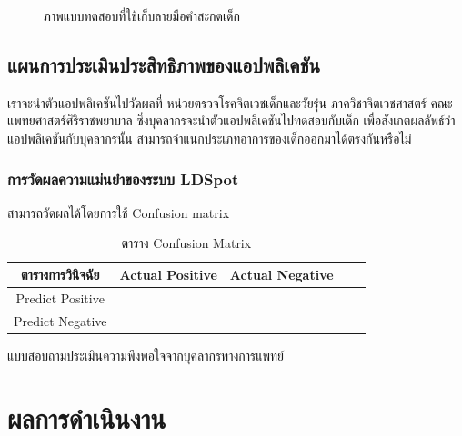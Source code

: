 \documentclass[12pt,oneside,openright,a4paper]{cpe-thai-project}
\begin{document}
\begin{figure}[!ht]\centering
  \setlength{\fboxrule}{0.2mm} %
  \setlength{\fboxsep}{1cm}
  \caption{ภาพแบบทดสอบที่ใช้เก็บลายมือคำสะกดเด็ก}\label{fig:system}
    
\end{figure}

\newpage
\section{แผนการประเมินประสิทธิภาพของแอปพลิเคชัน}
เราจะนำตัวแอปพลิเคชันไปวัดผลที่ หน่วยตรวจโรคจิตเวชเด็กและวัยรุ่น ภาควิชาจิตเวชศาสตร์ คณะแพทยศาสตร์ศิริราชพยาบาล  ซึ่งบุคลากรจะนำตัวแอปพลิเคชันไปทดสอบกับเด็ก เพื่อสังเกตผลลัพธ์ว่า แอปพลิเคชันกับบุคลากรนั้น สามารถจำแนกประเภทอาการของเด็กออกมาได้ตรงกันหรือไม่ 
\subsection{การวัดผลความแม่นยำของระบบ LDSpot}
สามารถวัดผลได้โดยการใช้ Confusion matrix 

\begin{table}[!h]\centering
  \caption{ตาราง Confusion Matrix}\label{tbl:confusion}
  \begin{tabular}{c|c|l|rr} \hline
  ตารางการวินิจฉัย & Actual Positive & Actual Negative \\ \hline
  Predict Positive & & \\ \hline
  Predict Negative & & \\ \hline
  \end{tabular}
  \end{table}


แบบสอบถามประเมินความพึงพอใจจากบุคลากรทางการแพทย์

\chapter{ผลการดำเนินงาน}
\end{document}
